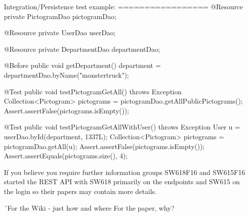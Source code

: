 Integration/Persistence test example:
=================
@Resource
    private PictogramDao pictogramDao;

    @Resource
    private UserDao userDao;

    @Resource
    private DepartmentDao departmentDao;

    @Before
    public void getDepartment() {
        department = departmentDao.byName("monstertruck");
    }

    @Test
    public void testPictogramGetAll() throws Exception {
        Collection<Pictogram> pictograms = pictogramDao.getAllPublicPictograms();
        Assert.assertFalse(pictograms.isEmpty());
    }

    @Test
    public void testPictogramGetAllWithUser() throws Exception {
        User u = userDao.byId(department, 1337L);
        Collection<Pictogram> pictograms = pictogramDao.getAll(u);
        Assert.assertFalse(pictograms.isEmpty());
        Assert.assertEquals(pictograms.size(), 4);
    }


If you believe you require further information groups SW618F16 and SW615F16 started the REST API with SW618 primarily on the endpoints and SW615 on the login so their papers may contain more details.

´For the Wiki - just how and where
For the paper, why?
